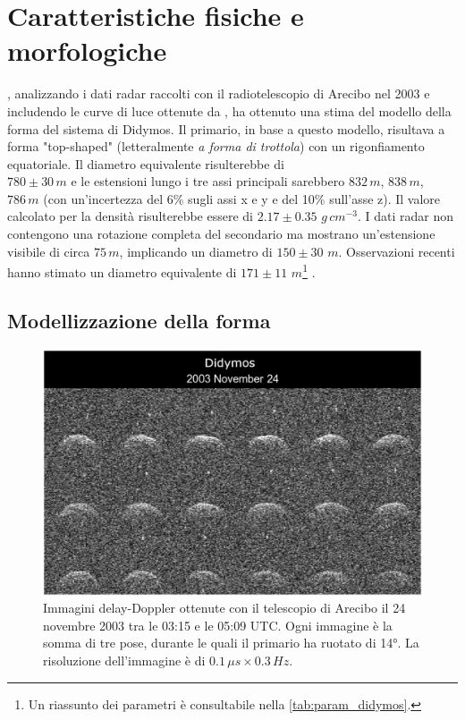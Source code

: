 \documentclass[a4paper,11pt,openright]{book}
\begin{document}
\section{Caratteristiche fisiche e morfologiche}
\citet{naidu_radar_2020}, analizzando i dati radar raccolti con il radiotelescopio di Arecibo nel 2003 e includendo le curve di luce ottenute da \citet{pravec_photometric_2006}, ha ottenuto una stima del modello della forma del sistema di Didymos. Il primario, in base a questo modello, risultava a forma "top-shaped" (letteralmente \textit{a forma di trottola}) con un rigonfiamento equatoriale. Il diametro equivalente risulterebbe di\\$780\pm 30\,m$ e le estensioni lungo i tre assi principali sarebbero $832\,m$, $838\,m$, $786\,m$ (con un'incertezza del 6\% sugli assi x e y e del 10\% sull'asse z). Il valore calcolato per la densità risulterebbe essere di $2.17\pm 0.35\,\, g\,cm^{-3}$. I dati radar non contengono una rotazione completa del secondario ma mostrano un'estensione visibile di circa $75\,m$, implicando un diametro di $150\pm 30\,\, m$. Osservazioni recenti hanno stimato un diametro equivalente di $171\pm 11\,\, m$\footnote{Un riassunto dei parametri è consultabile nella \cref{tab:param_didymos}.} \citep{scheirich_preimpact_2022}.


\subsection{Modellizzazione della forma}\label{sec:shape_model}

\begin{figure}[!h]
    \centering
    \includegraphics[scale=1.3]{figure/didymos_241103.jpg}
    \caption[Immagini delay-Doppler ottenute con il telescopio di Arecibo.]{Immagini delay-Doppler ottenute con il telescopio di Arecibo il 24 novembre 2003 tra le 03:15 e le 05:09 UTC. Ogni immagine è la somma di tre pose, durante le quali il primario ha ruotato di 14°. La risoluzione dell'immagine è di $0.1\,\mu s\times 0.3\,Hz$. \citep{naidu_radar_2020}}
    \label{fig:didymos_241103}
\end{figure}
\end{document}
